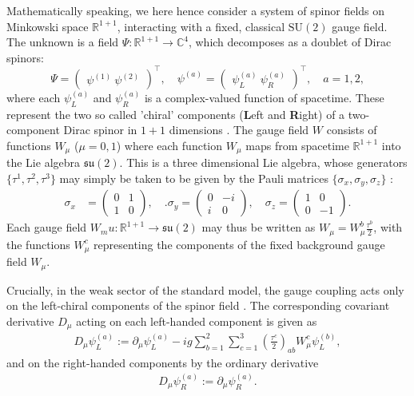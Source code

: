 \documentclass[reqno,12pt,letterpaper]{amsart}
\numberwithin{equation}{section}
\newcommand{\1}{\mathds{1}}
\theoremstyle{definition}
\begin{document}
Mathematically speaking, we here hence consider a system of spinor fields on Minkowski space \(\mathbb{R}^{1+1}\), interacting with a fixed, classical \(\mathrm{SU}(2)\) gauge field. The unknown is a field \(\Psi: \mathbb{R}^{1+1} \to \mathbb{C}^4\), which decomposes as a doublet of Dirac spinors:
\[
\Psi = \begin{pmatrix}
	\psi^{(1)} \
	\psi^{(2)}
\end{pmatrix}^\top, \quad
\psi^{(a)} = \begin{pmatrix}
	\psi_L^{(a)} \
	\psi_R^{(a)}
\end{pmatrix}^\top, \quad a = 1, 2,
\]
where each \(\psi_L^{(a)}\) and \(\psi_R^{(a)}\) is a complex-valued function of spacetime. These represent the two so called 'chiral' components (\textbf{L}eft and \textbf{R}ight) of a two-component Dirac spinor in \(1+1\) dimensions \cite{hamilton2017mathematical}.  
The gauge field $W $ consists of functions $W_{\mu}$ ($\mu = 0,1$) where each function $W_\mu$ maps from spacetime $\mathds{R}^{1+1}$ into the Lie algebra \(\mathfrak{su}(2)\). This is a three dimensional Lie algebra, whose generators $\{\tau^1,\tau^2, \tau^3 \}$ may simply be taken to be given by the Pauli matrices $\{\sigma_x, \sigma_y, \sigma_z \}$ :
\begin{align}
	\sigma_x&= \begin{pmatrix}
		0 & 1 \\
		1 & 0
	\end{pmatrix}, \quad
	.
	\sigma_y = \begin{pmatrix}
		0 & -i \\
		i & 0
	\end{pmatrix}, \quad
	\sigma_z = \begin{pmatrix}
		1 & 0 \\
		0 & -1
	\end{pmatrix}.
\end{align}
Each gauge field  $W_mu:\mathds{R}^{1+1} \rightarrow \mathfrak{su}(2) $	may thus be written as \(W_\mu = W_\mu^b \frac{\tau^b}{2}\), with the functions \(W_\mu^c\) representing the components of the fixed background gauge field $W_\mu$.



Crucially, in the weak sector of the standard model, the gauge coupling acts only on the left-chiral components of the spinor field \cite{peskin1995introduction}. The corresponding covariant derivative \(D_\mu\) acting on each left-handed component is given as \cite{srednicki2007quantum}
\begin{align}
	D_\mu \psi_L^{(a)} := \partial_\mu \psi_L^{(a)} - i g \sum_{b=1}^2 \sum_{c=1}^3 \left( \frac{\tau^c}{2} \right)_{ab} W_\mu^c \psi_L^{(b)},
\end{align}
and on the right-handed components by the ordinary derivative
\begin{align}
	D_\mu \psi_R^{(a)} := \partial_\mu \psi_R^{(a)}.
\end{align}
\end{document}
